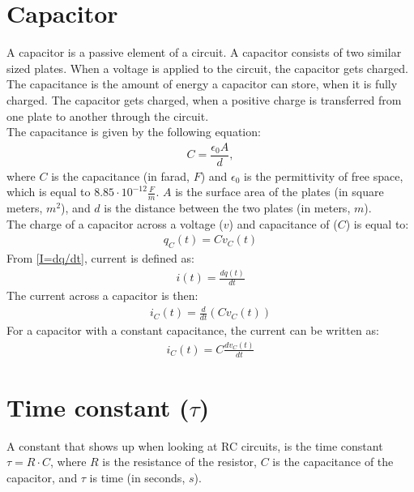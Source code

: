 \section{Capacitor}
A capacitor is a passive element of a circuit. A capacitor consists of two similar sized plates. When a voltage is applied to the circuit, the capacitor gets charged. The capacitance is the amount of energy a capacitor can store, when it is fully charged. The capacitor gets charged, when a positive charge is transferred from one plate to another through the circuit.
\\
The capacitance is given by the following equation:
\begin{align*}
C=\dfrac{\epsilon_{0}A}{d},
\end{align*}
where $C$ is the capacitance (in farad, $F$) and $\epsilon_{0}$ is the permittivity of free space, which is equal to $8.85 \cdot 10^{-12}                                                 \frac{F}{m}$. $A$ is the surface area of the plates (in square meters, $m^{2}$), and $d$ is the distance between the two plates (in meters, $m$).
\\
The charge of a capacitor across a voltage ($v$) and capacitance of ($C$) is equal to:
\begin{align}
\label{QCV}
q_C(t) = Cv_C(t)	
\end{align}
From \eqref{I=dq/dt}, current is defined as:
\begin{align*}
	i(t) = \frac{dq(t)}{dt}
\end{align*}
The current across a capacitor is then:
\begin{align*}
	i_C(t) = \frac{d}{dt}(Cv_C(t))
\end{align*}
For a capacitor with a constant capacitance, the current can be written as:
\begin{align}
	i_C(t) = C\frac{dv_C(t)}{dt}\label{iC}
\end{align}


\section{Time constant ($\tau$)}
A constant that shows up when looking at RC circuits, is the time constant $\tau = R \cdot C$, where $R$ is the resistance of the resistor, $C$ is the capacitance of the capacitor, and $\tau$ is time (in seconds, $s$).